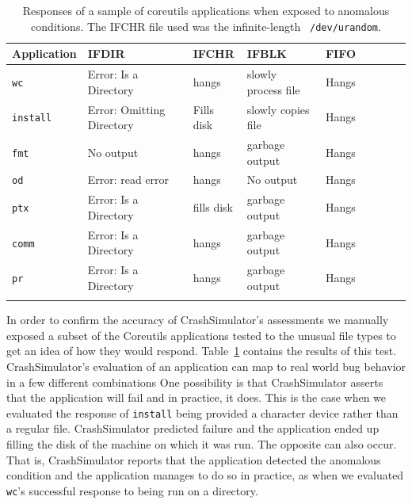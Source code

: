 \begin{table}[t]
    \scriptsize{}
    \begin{tabular}{l  l  l  l  l  l  l  l  l}
    \toprule{}
        Application         & IFDIR                     & IFCHR       & IFBLK                & FIFO \\
\hline
        {\tt wc}            & Error: Is a Directory     & hangs       & slowly process file  & Hangs\\
        {\tt install}       & Error: Omitting Directory & Fills disk  & slowly copies file   & Hangs\\
        {\tt fmt}           & No output                 & hangs       & garbage output       & Hangs\\
        {\tt od}            & Error: read error         & hangs       & No output            & Hangs\\
        {\tt ptx}           & Error: Is a Directory     & fills disk  & garbage output       & Hangs\\
        {\tt comm}          & Error: Is a Directory     & hangs       & garbage output       & Hangs\\
        {\tt pr}            & Error: Is a Directory     & hangs       & garbage output       & Hangs\\
\hline
    \bottomrule{}
    \end{tabular}
    \caption{Responses of a sample of coreutils applications when exposed to
      anomalous conditions.  The IFCHR file used was the infinite-length {\tt
        /dev/urandom}.}
    \label{table:applicationresponses}
\end{table}


In order to confirm the accuracy of CrashSimulator's assessments we manually
exposed a subset of the Coreutils applications tested to the unusual file
types to get an idea of how they would respond.
Table~\ref{table:applicationresponses} contains the results of this test.
CrashSimulator's evaluation of an application can map to real world bug behavior
in a few different combinations
One
possibility is that CrashSimulator asserts that the application will fail
and in practice, it does.  This is the case when we evaluated
the response of  {\tt install} being provided a character device
rather than a regular file. CrashSimulator predicted failure and the
application ended up filling the disk of the machine on which it was run.  The
opposite can also occur.  That is, CrashSimulator reports that the
application detected the anomalous condition and the application manages to
do so in practice,  as when we evaluated {\tt wc}'s successful response to
being run on a directory.

